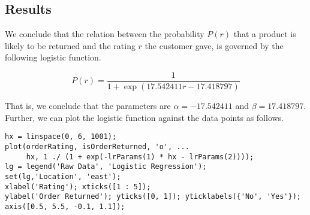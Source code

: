 \subsection{Results}

We conclude that the relation between the probability $P(r)$ that a product is likely to be returned and the rating $r$ the customer gave, is governed by the following logistic function.

$$P(r) = \frac{1}{1 + \exp(17.542411 r - 17.418797)}$$

\noindent
That is, we conclude that the parameters are $\alpha = -17.542411$ and $\beta = 17.418797$. Further, we can plot the logistic function against the data points as follows.

\begin{lstlisting}
hx = linspace(0, 6, 1001);
plot(orderRating, isOrderReturned, 'o', ...
     hx, 1 ./ (1 + exp(-lrParams(1) * hx - lrParams(2))));
lg = legend('Raw Data', 'Logistic Regression');
set(lg,'Location', 'east');
xlabel('Rating'); xticks([1 : 5]);
ylabel('Order Returned'); yticks([0, 1]); yticklabels({'No', 'Yes'});
axis([0.5, 5.5, -0.1, 1.1]);
\end{lstlisting}



